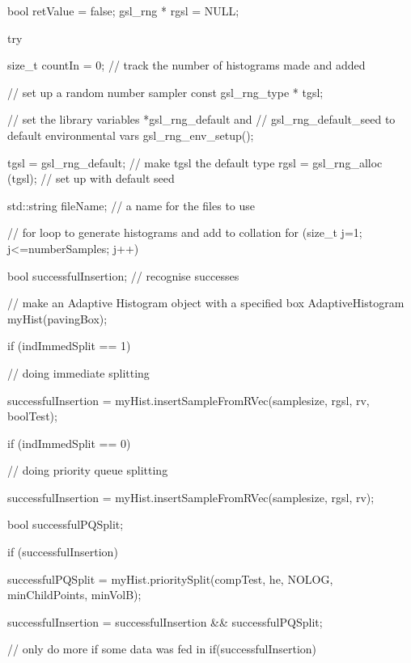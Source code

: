 \begin{DoxyCode}
{

    bool retValue = false;
    gsl_rng * rgsl = NULL;

    try {

        size_t countIn = 0; // track the number of histograms made and added

        // set up a random number sampler
        const gsl_rng_type * tgsl;

        // set the library variables *gsl_rng_default and
        // gsl_rng_default_seed to default environmental vars
        gsl_rng_env_setup();

        tgsl = gsl_rng_default; // make tgsl the default type
        rgsl = gsl_rng_alloc (tgsl); // set up with default seed

        std::string fileName; // a name for the files to use


        // for loop to generate histograms and add to collation
        for (size_t j=1; j<=numberSamples; j++) {

            bool successfulInsertion; // recognise successes

            // make an Adaptive Histogram object with a specified box
            AdaptiveHistogram myHist(pavingBox);

            if (indImmedSplit == 1) { // doing immediate splitting

                successfulInsertion = myHist.insertSampleFromRVec(samplesize,
                    rgsl, rv, boolTest);
            }

            if (indImmedSplit == 0) { // doing priority queue splitting

                successfulInsertion = myHist.insertSampleFromRVec(samplesize,
                    rgsl, rv);

                bool successfulPQSplit;

                if (successfulInsertion) {

                    successfulPQSplit = myHist.prioritySplit(compTest, he,
                                                    NOLOG, minChildPoints, 
      minVolB);
                }

                successfulInsertion = successfulInsertion && successfulPQSplit;

            }

            // only do more if some data was fed in
            if(successfulInsertion) {

}}}}
\end{DoxyCode}
